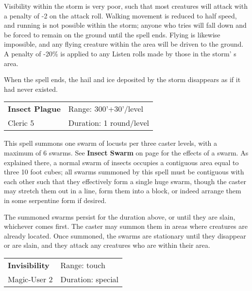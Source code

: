 \documentclass[a4paper,twoside,openany,10pt]{book}
\begin{document}
\begin{multicols}{2}
Visibility within the storm is very poor, such that most creatures will attack with a penalty of -2 on the attack roll. Walking movement is reduced to half speed, and running is not possible within the storm; anyone who tries will fall down and be forced to remain on the ground until the spell ends. Flying is likewise impossible, and any flying creature within the area will be driven to the ground. A penalty of -20\% is applied to any Listen rolls made by those in the storm' s area.

When the spell ends, the hail and ice deposited by the storm disappears as if it had never existed.

\smallskip\begin{flushleft} 
	\begin{tabularx}{0.45\textwidth}{@{}m{3.5cm}m{5.5cm}@{}} 
		\textbf{Insect Plague} & Range: 300'+30'/level\\
Cleric 5 &Duration: 1 round/level\\
	\end{tabularx}\end{flushleft}

This spell summons one swarm of locusts per three caster levels, with a maximum of 6 swarms. See \textbf{Insect Swarm} on page \hyperlink{insect-swarm}{\pageref{insect-swarm}} for the effects of a swarm. As explained there, a normal swarm of insects occupies a contiguous area equal to three 10 foot cubes; all swarms summoned by this spell must be contiguous with each other such that they effectively form a single huge swarm, though the caster may stretch them out in a line, form them into a block, or indeed arrange them in some serpentine form if desired.

The summoned swarms persist for the duration above, or until they are slain, whichever comes first. The caster may summon them in areas where creatures are already located. Once summoned, the swarms are stationary until they disappear or are slain, and they attack any creatures who are within their area.


\smallskip\begin{flushleft} 
	\begin{tabularx}{0.45\textwidth}{@{}m{3.5cm}m{5.5cm}@{}} 
		\textbf{Invisibility} & Range: touch\\
Magic-User 2 & Duration: special\\
	\end{tabularx}\end{flushleft}


\end{multicols}
\end{document}
